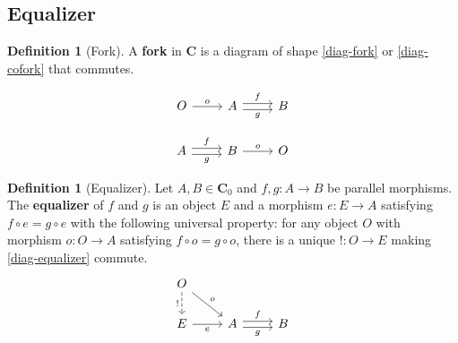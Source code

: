 \documentclass{article}
\theoremstyle{definition}
\newtheorem{defn}[thm]{Definition}
\theoremstyle{remark}
\begin{document}
\subsection{Equalizer}
\begin{defn}[Fork]
    A \textbf{fork} in $\mathbf{C}$ is a diagram of shape \eqref{diag-fork} or \eqref{diag-cofork} that commutes.\\
    \begin{minipage}{0.47\textwidth}
        \begin{equation}\label{diag-fork}
            \begin{tikzcd}
                O \arrow[r, "o"]                         & A \arrow[r, "f", shift left] \arrow[r, "g"', shift right] & B
            \end{tikzcd}
        \end{equation}
    \end{minipage}
    \begin{minipage}{0.47\textwidth}
        \begin{equation}\label{diag-cofork}
            \begin{tikzcd}
                A \arrow[r, "f", shift left] \arrow[r, "g"', shift right] & B \arrow[r, "o"] & O
            \end{tikzcd}
        \end{equation}
    \end{minipage}
\end{defn}
\begin{defn}[Equalizer]
    Let $A, B \in \mathbf{C}_0$ and $f,g:A\rightarrow B$ be parallel morphisms. The \textbf{equalizer} of $f$ and $g$ is an object $E$ and a morphism $e:E\rightarrow A$ satisfying $f\circ e = g \circ e$ with the following universal property: for any object $O$ with morphism $o:O\rightarrow A$ satisfying $f\circ o = g \circ o$, there is a unique $!: O \rightarrow E$ making \eqref{diag-equalizer} commute.
    \begin{equation}\label{diag-equalizer}
        \begin{tikzcd}
            O \arrow[rd, "o"] \arrow[d, "!"', dashed] &                                                           &   \\
            E \arrow[r, "e"']                         & A \arrow[r, "f", shift left] \arrow[r, "g"', shift right] & B
            \end{tikzcd}
    \end{equation}
\end{defn}
\end{document}
